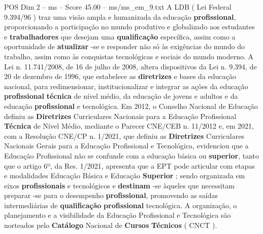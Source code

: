 \begin{textsample}{POS Dim 2 – ms – Score 45.00 – ms/ms\_em\_9.txt}
A LDB ( Lei Federal 9.394/96 ) traz uma visão ampla e humanizada da educação \textbf{profissional}, proporcionando a participação no mundo produtivo e globalizado aos estudantes e \textbf{trabalhadores} que desejam uma \textbf{qualificação} específica, assim como a oportunidade de \textbf{atualizar} -se e responder não só às exigências do mundo do trabalho, assim como às conquistas tecnológicas e sociais do mundo moderno.
A Lei n. 11.741/2008, de 16 de julho de 2008, altera dispositivos da Lei n. 9.394, de 20 de dezembro de 1996, que estabelece as \textbf{diretrizes} e bases da educação nacional, para redimensionar, institucionalizar e integrar as ações da educação \textbf{profissional} \textbf{técnica} de nível médio, da educação de jovens e adultos e da educação \textbf{profissional} e tecnológica.
Em 2012, o Conselho Nacional de Educação definiu as \textbf{Diretrizes} Curriculares Nacionais para a Educação Profissional \textbf{Técnica} de Nível Médio, mediante o Parecer CNE/CEB n. 11/2012 e, em 2021, com a Resolução CNE/CP n. 1/2021, que definiu as \textbf{Diretrizes} Curriculares Nacionais Gerais para a Educação Profissional e Tecnológica, evidenciou que a Educação Profissional não se confunde com a educação básica ou \textbf{superior}, tanto que o artigo 6º, da Res. 1/2021, apresenta que a EPT pode articular com etapas e modalidades Educação Básica e Educação \textbf{Superior} ; sendo organizada em eixos \textbf{profissionais} e tecnológicos e \textbf{destinam} -se àqueles que necessitam preparar -se para o desempenho \textbf{profissional}, promovendo as saídas intermediárias de \textbf{qualificação} \textbf{profissional} tecnológica.
A organização, o planejamento e a visibilidade da Educação Profissional e Tecnológica são norteados pelo \textbf{Catálogo} Nacional de \textbf{Cursos} \textbf{Técnicos} ( CNCT ).

\end{textsample}
